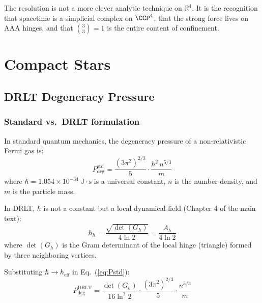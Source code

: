 \documentclass[12pt]{article}
\theoremstyle{remark}
\theoremstyle{definition}
\newcommand{\RR}{\mathbb{R}}
\begin{document}
The resolution is not a more clever analytic technique on $\RR^4$.
It is the recognition that spacetime is a simplicial complex on
$\CCP^4$, that the strong force lives on AAA hinges, and that
$\binom{3}{3} = 1$ is the entire content of confinement.



\section{Compact Stars}
\label{ch:compact_stars}

\subsection{DRLT Degeneracy Pressure}

\subsubsection{Standard vs.\ DRLT formulation}

In standard quantum mechanics, the degeneracy pressure of a non-relativistic Fermi gas is:
\begin{equation}
P_\text{deg}^\text{std} = \frac{(3\pi^2)^{2/3}}{5} \cdot \frac{\hbar^2\,n^{5/3}}{m}
\label{eq:Pstd}
\end{equation}
where $\hbar = 1.054 \times 10^{-34}\;\text{J}\cdot\text{s}$ is a universal constant, $n$ is the number density, and $m$ is the particle mass.

In DRLT, $\hbar$ is not a constant but a local dynamical field (Chapter 4 of the main text):
\begin{equation}
\hbar_h = \frac{\sqrt{\det(G_h)}}{4\ln 2} = \frac{A_h}{4\ln 2}
\end{equation}
where $\det(G_h)$ is the Gram determinant of the local hinge (triangle) formed by three neighboring vertices.

Substituting $\hbar \to \hbar_\text{eff}$ in Eq.~(\ref{eq:Pstd}):
\begin{equation}
\boxed{P_\text{deg}^\text{DRLT} = \frac{\det(G_h)}{16\ln^2 2} \cdot \frac{(3\pi^2)^{2/3}}{5} \cdot \frac{n^{5/3}}{m}}
\label{eq:Pdrlt}
\end{equation}
\end{document}
